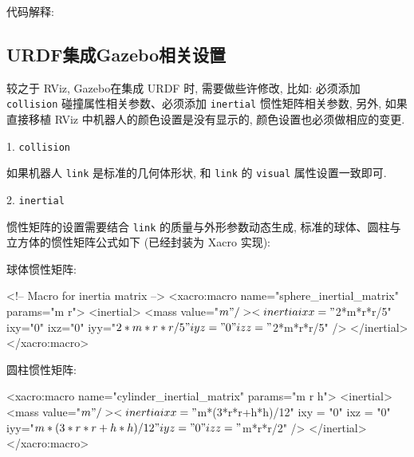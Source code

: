 \documentclass[openany, fontset=windowsold]{ctexbook}
\theoremstyle{kaiti}
\theoremstyle{normal}
\begin{document}
代码解释:


\subsection{URDF集成Gazebo相关设置}

较之于 RViz, Gazebo在集成 URDF 时, 需要做些许修改, 比如: 必须添加 \verb|collision| 碰撞属性相关参数、必须添加 \verb|inertial| 惯性矩阵相关参数, 另外, 如果直接移植 RViz 中机器人的颜色设置是没有显示的, 颜色设置也必须做相应的变更.

1. \verb|collision|

如果机器人 \verb|link| 是标准的几何体形状, 和 \verb|link| 的 \verb|visual| 属性设置一致即可.

2. \verb|inertial|

惯性矩阵的设置需要结合 \verb|link| 的质量与外形参数动态生成, 标准的球体、圆柱与立方体的惯性矩阵公式如下 (已经封装为 Xacro 实现):

球体惯性矩阵:

\begin{xml}
  <!-- Macro for inertia matrix -->
  <xacro:macro name="sphere_inertial_matrix" params="m r">
      <inertial>
          <mass value="${m}" />
          <inertia ixx="${2*m*r*r/5}" ixy="0" ixz="0"
              iyy="${2*m*r*r/5}" iyz="0" 
              izz="${2*m*r*r/5}" />
      </inertial>
  </xacro:macro>
\end{xml}

圆柱惯性矩阵:

\begin{xml}
  <xacro:macro name="cylinder_inertial_matrix" params="m r h">
    <inertial>
        <mass value="${m}" />
        <inertia ixx="${m*(3*r*r+h*h)/12}" ixy = "0" ixz = "0"
            iyy="${m*(3*r*r+h*h)/12}" iyz = "0"
            izz="${m*r*r/2}" /> 
    </inertial>
  </xacro:macro>
\end{xml}
\end{document}
